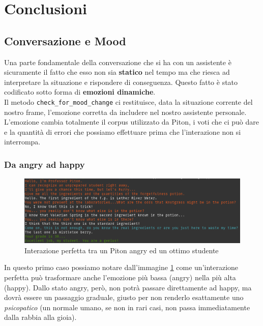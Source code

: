\section{Conclusioni}
\subsection{Conversazione e Mood}
Una parte fondamentale della conversazione che si ha con un assistente è sicuramente il fatto che esso non sia \textbf{statico} nel tempo ma che riesca ad interpretare la situazione e rispondere di conseguenza.
Questo fatto è stato codificato sotto forma di \textbf{emozioni dinamiche}.
\\
Il metodo \texttt{check\_for\_mood\_change} ci restituisce, data la situazione corrente del nostro frame, l'emozione corretta da includere nel nostro assistente personale. L'emozione cambia totalmente il corpus utilizzato da Piton, i voti che ci può dare e la quantità di errori che possiamo effettuare prima che l'interazione non si interrompa.
\subsubsection{Da angry ad happy}
\begin{figure}[!htb]
    \centering
    \includegraphics[scale=0.45]{Images/from_angry_to_happy.png}
    \caption{Interazione perfetta tra un Piton angry ed un ottimo studente}
    \label{fig:from_angry_to_happy}
\end{figure}
In questo primo caso possiamo notare dall'immagine \ref{fig:from_angry_to_happy} come un'interazione perfetta può trasformare anche l'emozione più bassa (angry) nella più alta (happy). Dallo stato angry, però, non potrà passare direttamente ad happy, ma dovrà essere un passaggio graduale, giusto per non renderlo esattamente uno \textit{psicopatico} (un normale umano, se non in rari casi, non passa immediatamente dalla rabbia alla gioia). 
